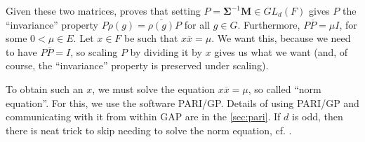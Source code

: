 \documentclass[11pt]{article}
\begin{document}
Given these two matrices, \cite{Pas21} proves that setting $P = \mathbf{\Sigma}^{-1}\mathbf{M} \in GL_d(F)$
gives $P$ the ``invariance'' property $P\rho(g) = \overline{\rho(g)}P$ for all $g \in G$. Furthermore, $P\overline{P} = \mu I$,
for some $0 < \mu \in E$. Let $x\in F$ be such that $x\overline{x} = \mu$. We want this, because we need
to have $P\overline{P} = I$, so scaling $P$ by dividing it by $x$ gives us what we want (and, of course,
the ``invariance'' property is preserved under scaling).

To obtain such an $x$, we must solve the equation $x\overline{x} = \mu$, so called ``norm equation''.
For this, we use the software PARI/GP. Details of using PARI/GP and
communicating with it from within GAP are in the \cref{sec:pari}. If $d$ is odd, then
there is neat trick to skip needing to solve the norm equation, cf. \cite[Lemma 3.4]{Pas21}.
\end{document}
